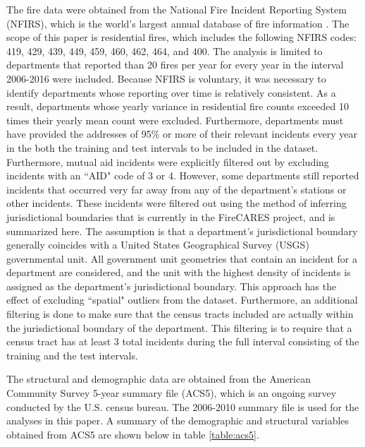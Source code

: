 \documentclass{svjour3}
\begin{document}
The fire data were obtained from the National Fire Incident Reporting System (NFIRS), which is the world's largest annual database of fire information \cite{usfa2}. The scope of this paper is residential fires, which includes the following NFIRS codes: 419, 429, 439, 449, 459, 460, 462, 464, and 400. The analysis is limited to departments that reported than 20 fires per year for every year in the interval 2006-2016 were included. Because NFIRS is voluntary, it was necessary to identify departments whose reporting over time is relatively consistent. As a result, departments whose yearly variance in residential fire counts exceeded 10 times their yearly mean count were excluded. Furthermore, departments must have provided the addresses of 95\% or more of their relevant incidents every year in the both the training and test intervals to be included in the dataset. Furthermore, mutual aid incidents were explicitly filtered out by excluding incidents with an ``AID" code of 3 or 4. However, some departments still reported incidents that occurred very far away from any of the department's stations or other incidents. These incidents were filtered out using the method of inferring jurisdictional boundaries that is currently in the FireCARES project, and is summarized here. The assumption is that a department's jurisdictional boundary generally coincides with a United States Geographical Survey (USGS) governmental unit. All government unit geometries that contain an incident for a department are considered, and the unit with the highest density of incidents is assigned as the department's jurisdictional boundary. This approach has the effect of excluding ``spatial" outliers from the dataset. Furthermore, an additional filtering is done to make sure that the census tracts included are actually within the jurisdictional boundary of the department. This filtering is to require that a census tract has at least 3 total incidents during the full interval consisting of the training and the test intervals. 

The structural and demographic data are obtained from the American Community Survey 5-year summary file (ACS5), which is an ongoing survey conducted by the U.S. census bureau. The 2006-2010 summary file is used for the analyses in this paper. A summary of the demographic and structural variables obtained from ACS5 are shown below in table \ref{table:acs5}.
\end{document}
